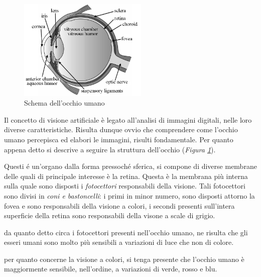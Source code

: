 \documentclass{subfiles}
\begin{document}
\label{sec:1}
\begin{figure}
    \centering
    \includegraphics[width = 0.55\textwidth]{../../Figure/Other/Diagram of the human eye.png}
    \caption{Schema dell'occhio umano}
    \label{fig:1.1}
\end{figure}
Il concetto di visione artificiale è legato all'analisi di immagini digitali, nelle loro diverse caratteristiche.
Risulta dunque ovvio che comprendere come l'occhio umano percepisca ed elabori le immagini, risulti fondamentale.
Per quanto appena detto si descrive a seguire la struttura dell'occhio (\emph{Figura \ref{fig:1.1}}).

Questi é un'organo dalla forma pressoché sferica, si compone di diverse membrane delle quali di principale interesse è la retina.
Questa è la membrana più interna sulla quale sono disposti i \emph{fotocettori} responsabili della visione.
Tali fotocettori sono divisi in \emph{coni \emph{e} bastoncelli}: i primi in minor numero,
sono disposti attorno la fovea e sono responsabili della visione a colori,
i secondi presenti sull'intera superficie della retina sono responsabili della visone a scale di grigio.
\begin{Remark*}
    da quanto detto circa i fotocettori presenti nell'occhio umano,
    ne risulta che gli esseri umani sono molto più sensibili a variazioni di luce che non di colore.
\end{Remark*}

\begin{Remark*}
    per quanto concerne la visione a colori, si tenga presente che l'occhio umano è maggiormente sensibile, nell'ordine, a variazioni di verde, rosso e blu.
\end{Remark*}
\end{document}
